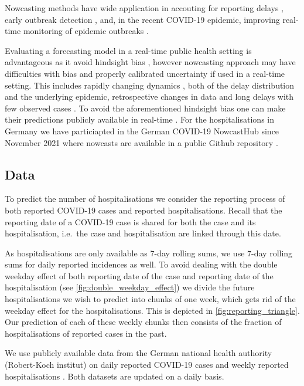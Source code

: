 Nowcasting methods have wide application in accouting for reporting
delays \cite{Midthune2005Modeling}, early outbreak detection
\cite{Salmon2015Bayesian,Bastos2019Modelling}, and, in the recent
COVID-19 epidemic, improving real-time monitoring of epidemic outbreaks
\cite{AnDerHeiden2020Schatzung,Gunther2021Nowcasting,Schneble2021Nowcasting,Akhmetzhanov2021Estimation}.

Evaluating a forecasting model in a real-time public health setting is
advantageous as it avoid hindsight bias \cite{Desai2019Realtime},
however nowcasting approach may have difficulties with bias and properly
calibrated uncertainty if used in a real-time setting. This includes
rapidly changing dynamics
\cite{Gunther2021Nowcasting,vandeKassteele2019Nowcasting}, both of
the delay distribution and the underlying epidemic, retrospective
changes in data \cite{Midthune2005Modeling} and long delays with
few observed cases \cite{Noufaily2015Modelling}. To avoid the
aforementioned hindsight bias one can make their predictions publicly
available in real-time
\cite{Ray2020Ensemble,Bracher2021Preregistered}. For the
hospitalisations in Germany we have particiapted in the German COVID-19
NowcastHub \cite{2022Nowcasts} since November 2021 where nowcasts
are available in a public Github repository
\cite{2022Hospitalization}.
\subsection{Data}
To predict the number of hospitalisations we consider the reporting
process of both reported COVID-19 cases and reported hospitalisations.
Recall that the reporting date of a COVID-19 case is shared for both the
case and its hospitalisation, i.e.~the case and hospitalisation are
linked through this date.

As hospitalisations are only available as \(7\)-day rolling sums, we use \(7\)-day rolling sums for daily
reported incidences as well. To avoid dealing with the double weekday
effect of both reporting date of the case and reporting date of the
hospitalisation (see \cref{fig:double_weekday_effect}) we divide the
future hospitalisations we wish to predict into chunks of one week,
which gets rid of the weekday effect for the hospitalisations. This is
depicted in \cref{fig:reporting_triangle}. Our prediction of each of
these weekly chunks then consists of the fraction of hospitalisations of
reported cases in the past.

We use publicly available data from the German national health authority
(Robert-Koch institut) on daily reported COVID-19 cases
\cite{RobertKoch-Institut2022SARSCoV2} and weekly reported
hospitalisations
\cite{RobertKoch-Institut2021COVID19Hospitalisierungen}. Both
datasets are updated on a daily basis.

